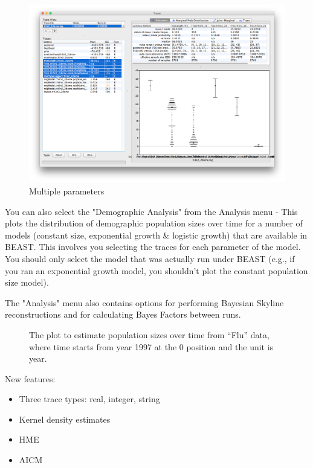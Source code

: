 \documentclass{bioinfo}
\begin{document}
\begin{figure}[ht]
\includegraphics[width=.5\textwidth]{./figures/multitrace.png}  
\caption{Multiple parameters}
\label{fig:multitrace}
\end{figure}



You can also select the "Demographic Analysis" from the Analysis menu - This plots the distribution of demographic population sizes over time for a number of models (constant size, exponential growth \& logistic growth) that are available in BEAST. This involves you selecting the traces for each parameter of the model. You should only select the model that was actually run under BEAST (e.g., if you ran an exponential growth model, you shouldn't plot the constant population size model).

The "Analysis" menu also contains options for performing Bayesian Skyline reconstructions and for calculating Bayes Factors between runs.


\begin{figure}[ht]
\caption{The plot to estimate population sizes over time from ``Flu'' data, where time starts from year 1997 at the 0 position and the unit is year.}
\label{fig:flu}
\end{figure}




New features:
\begin{itemize}
\item Three trace types: real, integer, string
\item Kernel density estimates
\item HME
\item AICM
\end{itemize}
\end{document}
